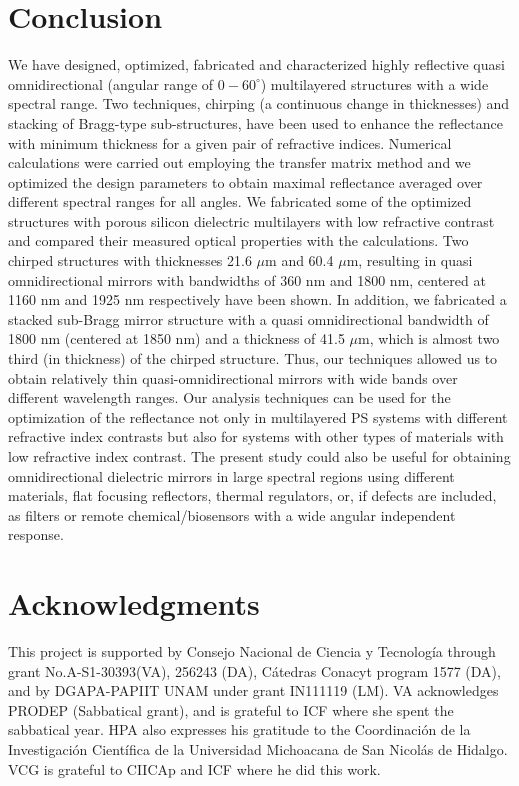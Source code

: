 \documentclass[a4paper,fleqn]{cas-sc}
\begin{document}
\section{Conclusion}\label{s:conc}

We have designed, optimized, fabricated and characterized highly reflective quasi
omnidirectional (angular range of $0-60^\circ$) multilayered structures with a wide
spectral range. Two techniques, chirping (a continuous change in thicknesses) and
stacking of Bragg-type sub-structures, have been used to enhance the reflectance with minimum thickness for a given pair of refractive indices. Numerical calculations were
carried out employing the transfer matrix method and we optimized the
design parameters to obtain maximal reflectance averaged over different spectral ranges for
all angles.
We fabricated some of the optimized structures with
porous silicon
dielectric multilayers with low refractive contrast and compared their measured  optical properties
with the calculations. Two chirped structures
with thicknesses 21.6 $\mu$m and 60.4 $\mu$m,
resulting in quasi omnidirectional mirrors with bandwidths of 360 nm and 1800 nm, centered
at 1160 nm and 1925 nm respectively have been shown. In addition,
we fabricated a stacked sub-Bragg mirror structure  with a quasi
omnidirectional bandwidth of 1800 nm (centered at 1850 nm) and a
thickness of 41.5 $\mu$m, which is almost two third (in thickness)
of the chirped structure.
Thus, our techniques allowed us to obtain relatively thin quasi-omnidirectional mirrors with wide bands
over different wavelength ranges.
Our analysis techniques can
be used for the optimization of the reflectance not only in multilayered PS systems with
different refractive index contrasts but also for systems with other types of
materials with low refractive index contrast. The present study could also be useful for obtaining omnidirectional dielectric mirrors in large spectral regions using different materials,  flat focusing reflectors, thermal regulators, or, if
defects are included, as filters or remote chemical/biosensors with
a wide angular independent response.


\section*{Acknowledgments}

This project is supported by Consejo Nacional de Ciencia y
Tecnolog\'{i}a through grant No.A-S1-30393(VA), 256243 (DA), C\'{a}tedras
Conacyt program 1577 (DA), and by DGAPA-PAPIIT UNAM under grant IN111119 (LM).
VA acknowledges PRODEP (Sabbatical grant), and
is grateful to ICF where she spent the sabbatical year.
HPA also expresses his gratitude to the Coordinaci\'{o}n
de la Investigaci\'{o}n Cient\'{i}fica de la Universidad
Michoacana de San Nicol\'{a}s de Hidalgo. VCG is grateful to CIICAp
and ICF where he did this work.

\printcredits



\end{document}

